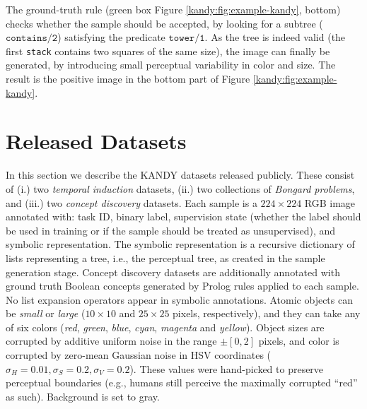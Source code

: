 \vskip 2mm
The ground-truth rule (green box Figure \ref{kandy:fig:example-kandy}, bottom) checks whether the sample should be accepted, by looking for a subtree ($\texttt{contains/2}$) satisfying the predicate $\texttt{tower/1}$. As the tree is indeed valid (the first \texttt{stack} contains two squares of the same size), the image can finally be generated, by introducing small perceptual variability in color and size. The result is the  positive image in the bottom part of Figure \ref{kandy:fig:example-kandy}.


\section{Released Datasets}\label{kandy:sec:curricula}
In this section we describe the \textsc{KANDY} datasets released publicly. These consist of (i.) two \textit{temporal induction} datasets, (ii.) two collections of \textit{Bongard problems}, and (iii.) two \textit{concept discovery} datasets.
%
Each sample is a $224 \times 224$ RGB image annotated with: task ID, binary label, supervision state (whether the label should be used in training or if the sample should be treated as unsupervised), and symbolic representation. %
The symbolic representation is a recursive dictionary of lists representing a tree, i.e., the perceptual tree, as created in the sample generation stage. %
Concept discovery datasets are additionally annotated with ground truth Boolean concepts generated by Prolog rules applied to each sample.
No list expansion operators appear in symbolic annotations.
%
Atomic objects can be {\it small} or {\it large} ($10 \times 10$ and $25 \times 25$ pixels, respectively), and they can take any of six colors ({\it red}, {\it green}, {\it blue}, {\it cyan}, {\it magenta} and {\it yellow}). Object sizes are corrupted by additive uniform noise in the range $\pm[0, 2]$ pixels, and color is corrupted by zero-mean Gaussian noise in HSV coordinates ($\sigma_H = 0.01, \sigma_S = 0.2, \sigma_V = 0.2$). These values were hand-picked to preserve perceptual boundaries (e.g., humans still perceive the maximally corrupted ``red'' as such). Background is set to gray.


